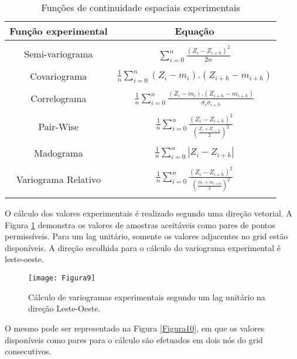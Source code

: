 \begin{table}[H]
	\centering
	\caption{Funções de continuidade espaciais experimentais}
	\label{Tabela 3}
	\begin{tabular}{cc}
		\toprule
		\textbf{Função experimental} &  \textbf{Equação} \\\midrule \\
		Semi-variograma                      & $\sum_{i=0}^{n}\frac{\left( Z_i - Z_{i+h} \right)^2 }{2n} $      \\ \\
		Covariograma                        & $\frac{1}{n}\sum_{i=0}^{n} (Z_i-m_i).(Z_{i+h}-m_{i+h})$       \\ \\
		Correlograma                       & $\frac{1}{n}\sum_{i=0}^{n}\frac{ (Z_i-m_i).(Z_{i+h}-m_{i+h})}{\sigma_i\sigma_{i+h}}$   \\   \\
		Pair-Wise                       & $\frac{1}{n}\sum_{i=0}^{n} \frac{(Z_i-Z_{i+h})^2}{\left( \frac{Z_i + Z_{i+h}}{2}\right)^2}$      \\ \\
		Madograma                      & $\frac{1}{n} \sum_{i=0}^{n} \left| Z_i -Z_{i+h} \right|  $       \\ \\ 
		Variograma Relativo              & 
		$\frac{1}{n}\sum_{i=0}^{n} \frac{(Z_i-Z_{i+h})^2}{\left( \frac{m_i + m_{i+h}}{2}\right)^2}$      \\ \\ \bottomrule     
	\end{tabular}
\end{table}

O cálculo dos valores experimentais é realizado segundo uma direção vetorial. A Figura \ref{Figura9} demonstra os valores de amostras aceitáveis como pares de pontos permissíveis. Para um lag unitário, somente os valores adjacentes no grid estão disponíveis. A direção escolhida para o cálculo do variograma experimental é leste-oeste. 

\begin{figure}[H]
	\centering
	\texttt{[image: Figura9]}
	\caption{Cálculo de variogramas experimentais segundo um lag unitário na direção Leste-Oeste.}
	\label{Figura9}
\end{figure}

O mesmo pode ser representado na Figura \ref{Figura10}, em que os valores disponíveis como pares para o cálculo são efetuados em dois nós do grid consecutivos. 

